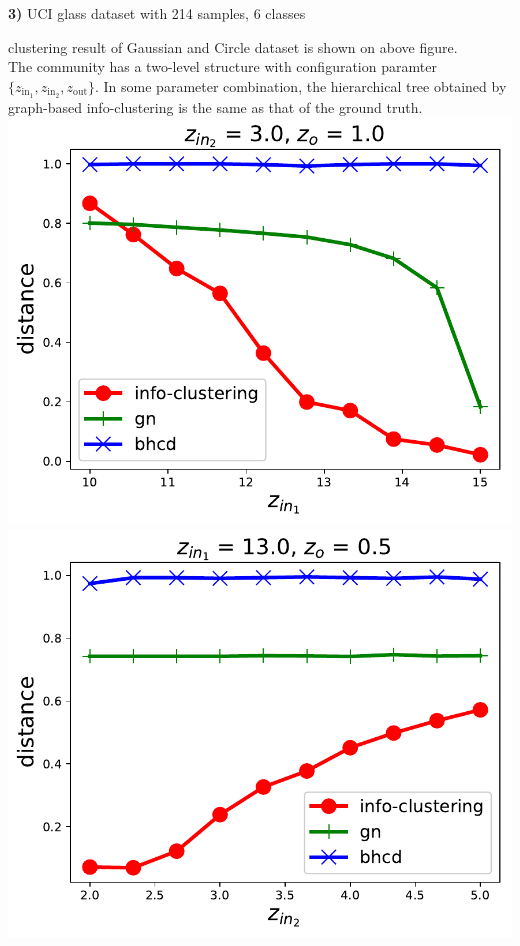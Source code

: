 \documentclass[portrait,final,a1paper,fontscale=0.3]{baposter}
\begin{document}
\begin{poster}
{\begin{multicols}{2}
\textbf{3)} UCI glass dataset with 214 samples, 6 classes

clustering result of Gaussian and Circle dataset is shown on above figure.
\\

The community has a two-level structure with configuration paramter $\{z_{\mathrm{in}_1}, z_{\mathrm{in}_2}, z_{\mathrm{out}} \}$.
In some parameter combination, the hierarchical tree obtained by graph-based info-clustering is the same as that of the ground truth.\\

{
\includegraphics[width=0.46\linewidth]{img/z_in_1.pdf}
\includegraphics[width=0.46\linewidth]{img/z_in_2.pdf}
}

\end{multicols}

}


\end{poster}
\end{document}
